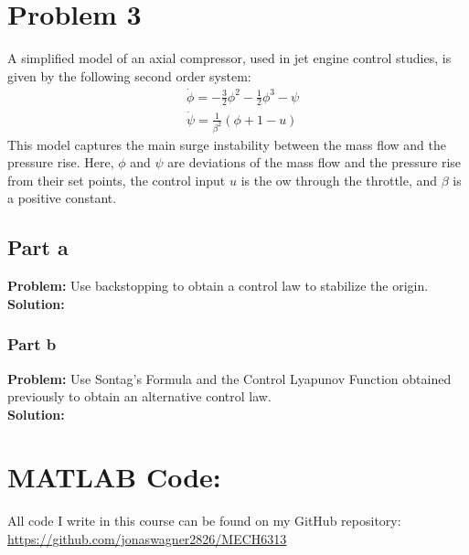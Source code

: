 \documentclass[letter]{article}
\begin{document}
\section{Problem 3}
A simplified model of an axial compressor, used in jet engine control studies, is given by the following second order system:
\begin{equation}
	\begin{aligned}
		&\dot{\phi} = - \frac{3}{2} \phi^2 - \frac{1}{2} \phi^3 - \psi\\
		&\dot{\psi} = \frac{1}{\beta^2}(\phi + 1 - u)
	\end{aligned}
\end{equation}
This model captures the main surge instability between the mass flow and the pressure rise. Here, $\phi$ and $\psi$ are deviations of the mass flow and the pressure rise from their set points, the control input $u$ is the 
ow through the throttle, and $\beta$ is a positive constant.

\subsection{Part a}
\textbf{Problem:}
Use backstopping to obtain a control law to stabilize the origin.\\

\noindent
\textbf{Solution:}



\subsubsection{Part b}
\textbf{Problem:}
Use Sontag's Formula and the Control Lyapunov Function obtained previously to obtain an alternative control law.\\

\noindent
\textbf{Solution:}





\newpage
\appendix
\section{MATLAB Code:}\label{apx:matlab}
All code I write in this course can be found on my GitHub repository:\\
\href{https://github.com/jonaswagner2826/MECH6313}{https://github.com/jonaswagner2826/MECH6313}
%
\end{document}

